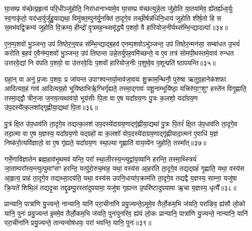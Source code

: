 घा॒सम्प्र य॑च्छेत्प्र॒हृत्य॑ परि॒धीञ्जु॑होति॒ निरा॑धानाभ्यामे॒व घा॒सम्प्र य॑च्छत्युन्ने॒ता जु॑होति या॒तया॑मेव॒ ह्ये॑तर्\mbox{}ह्य॑ध्व॒र्युः स्व॒गाकृ॑तो॒ यद॑ध्व॒र्युर्जु॑हु॒याद्यथा॒ विमु॑क्त॒म्पुन॑र्यु॒नक्ति॑ ता॒दृगे॒व तच्छी॒र्\mbox{}षन्न॑धिनि॒धाय॑ जुहोति शीर्\mbox{}ष॒तो हि स स॒मभ॑वद्वि॒क्रम्य॑ जुहोति वि॒क्रम्य॒ हीन्द्रो॑ वृ॒त्रमह॒न्थ्समृ॑द्ध्यै प॒शवो॒ वै हा॑रियोज॒नीर्यथ्स॑म्भि॒न्द्यादल्पाः᳚॥३४॥

ए॒न॒म्प॒शवो॑ भु॒ञ्जन्त॒ उप॑ तिष्ठेर॒न्॒यन्न स॑म्भि॒न्द्याद्ब॒हव॑ एनम्प॒शवो\-ऽभु॑ञ्जन्त॒ उप॑ तिष्ठेर॒न्मन॑सा॒ सम्बा॑धत उ॒भयं॑ करोति ब॒हव॑ ए॒वैन॑म्प॒शवो॑ भु॒ञ्जन्त॒ उप॑ तिष्ठन्त उन्ने॒तर्यु॑पह॒वमि॑च्छन्ते॒ य ए॒व तत्र॑ सोमपी॒थस्तमे॒वाव॑ रुन्धत उत्तरवे॒द्यां नि व॑पति प॒शवो॒ वा उ॑त्तरवे॒दिः प॒शवो॑ हारियोज॒नीः प॒शुष्वे॒व प॒शून्प्रति॑ ष्ठापयन्ति॥३५॥

{\anuvakamend[{अ॒श्री॒णा॒द॒न्तरा॑धानाभ्या॒मल्पाः᳚ स्थापयन्ति॥९॥}]}

ग्रहा॒न् वा अनु॑ प्र॒जाः प॒शवः॒ प्र जा॑यन्त उपाꣳश्वन्तर्या॒माव॑जा॒वयः॑ शु॒क्राम॒न्थिनौ॒ पुरु॑षा ऋतुग्र॒हानेक॑शफा आदित्यग्र॒हं गाव॑ आदित्यग्र॒हो भूयि॑ष्ठाभिर्\mbox{}ऋ॒ग्भिर्गृ॑ह्यते॒ तस्मा॒द्गावः॑ पशू॒नाम्भूयि॑ष्ठा॒ यत्त्रिरु॑पा॒ꣳ॒शुꣳ हस्ते॑न विगृ॒ह्णाति॒ तस्मा॒द्द्वौ त्रीन॒जा ज॒नय॒त्यथाव॑यो॒ भूय॑सीः पि॒ता वा ए॒ष यदा᳚ग्रय॒णः पु॒त्रः क॒लशो॒ यदा᳚ग्रय॒ण उ॑प॒दस्ये᳚त्क॒लशा᳚द्गृह्णीया॒द्यथा॑ पि॒ता॥३६॥

पु॒त्रं क्षि॒त उ॑प॒धाव॑ति ता॒दृगे॒व तद्यत्क॒लश॑ उप॒दस्ये॑दाग्रय॒णाद्गृ॑ह्णीया॒द्यथा॑ पु॒त्रः पि॒तरं॑ क्षि॒त उ॑प॒धाव॑ति ता॒दृगे॒व तदा॒त्मा वा ए॒ष य॒ज्ञस्य॒ यदा᳚ग्रय॒णो यद्ग्रहो॑ वा क॒लशो॑ वोप॒दस्ये॑दाग्रय॒णाद्गृ॑ह्णीयादा॒त्मन॑ ए॒वाधि॑ य॒ज्ञं निष्क॑रो॒त्यवि॑ज्ञातो॒ वा ए॒ष गृ॑ह्यते॒ यदा᳚ग्रय॒णः स्था॒ल्या गृ॒ह्णाति॑ वाय॒व्ये॑न जुहोति॒ तस्मा᳚त्॥३७॥

गर्भे॒णावि॑ज्ञातेन ब्रह्म॒हाव॑भृ॒थमव॑ यन्ति॒ परा᳚ स्था॒लीरस्य॒न्त्युद्वा॑य॒व्या॑नि हरन्ति॒ तस्मा॒थ्स्त्रियं॑ जा॒ताम्परा᳚स्य॒न्त्यु\-त्पुमाꣳ॑सꣳ हरन्ति॒ यत्पु॑रो॒रुच॒माह॒ यथा॒ वस्य॑स आ॒हर॑ति ता॒दृगे॒व तद्यद्ग्रहं॑ गृ॒ह्णाति॒ यथा॒ वस्य॑स आ॒हृत्य॒ प्राह॑ ता॒दृगे॒व तद्यथ्सा॒दय॑ति॒ यथा॒ वस्य॑स उपनि॒धाया॑प॒क्राम॑ति ता॒दृगे॒व तद्यद्वै य॒ज्ञस्य॒ साम्ना॒ यजु॑षा क्रि॒यते॑ शिथि॒लं तद्यदृ॒चा तद्दृ॒ढम्पु॒रस्ता॑दुपयामा॒ यजु॑षा गृह्यन्त उ॒परि॑ष्टादुपयामा ऋ॒चा य॒ज्ञस्य॒ धृत्यै᳚॥३८॥

{\anuvakamend[{यथा॑ पि॒ता तस्मा॑दप॒क्राम॑ति ता॒दृगे॒व तद्यद॒ष्टाद॑श च॥10॥}]}

प्रान्यानि॒ पात्रा॑णि यु॒ज्यन्ते॒ नान्यानि॒ यानि॑ परा॒चीना॑नि प्रयु॒ज्यन्ते॒\-ऽमुमे॒व तैर्लो॒कम॒भि ज॑यति॒ परा॑ङिव॒ ह्य॑सौ लो॒को यानि॒ पुनः॑ प्रयु॒ज्यन्त॑ इ॒ममे॒व तैर्लो॒कम॒भि ज॑यति॒ पुनः॑पुनरिव॒ ह्य॑यं लो॒कः प्रान्यानि॒ पात्रा॑णि यु॒ज्यन्ते॒ नान्यानि॒ यानि॑ परा॒चीना॑नि प्रयु॒ज्यन्ते॒ तान्यन्वोष॑धयः॒ परा॑ भवन्ति॒ यानि॒ पुनः॑॥३९॥

